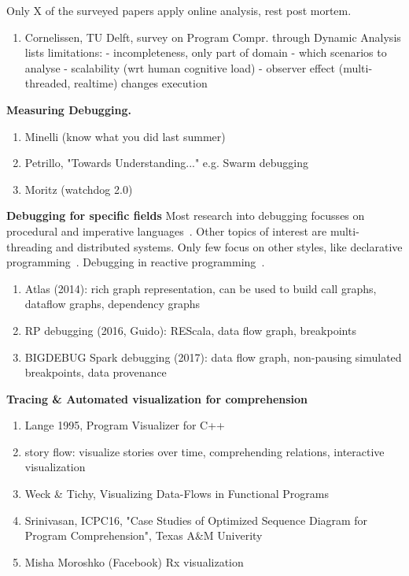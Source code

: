 Only X of the surveyed papers apply online analysis, rest post mortem.

{\color{red}
\begin{enumerate}
 \item Cornelissen, TU Delft, survey on Program Compr. through Dynamic Analysis
 		lists limitations: 
		   - incompleteness, only part of domain
			 - which scenarios to analyse
			 - scalability (wrt human cognitive load) 
		 	 - observer effect (multi-threaded, realtime) changes execution
\end{enumerate}
}

\textbf{Measuring Debugging.}
{\color{red}
\begin{enumerate}
	\item Minelli (know what you did last summer)
	\item Petrillo, "Towards Understanding..." e.g. Swarm debugging
  \item Moritz (watchdog 2.0)
\end{enumerate}
}

\textbf{Debugging for specific fields}
Most research into debugging focusses on procedural and 
imperative languages~\cite{cornelissen2009systematic}.
Other topics of interest are multi-threading and distributed systems.
Only few focus on other styles, like 
declarative programming~\cite{nilsson1998declarative}.
Debugging in reactive programming~\cite{
	salvaneschi2014empirical,salvaneschi2016debugging}.
	
{\color{red}
\begin{enumerate}
	\item Atlas (2014): rich graph representation, can be used to build call graphs, dataflow graphs, dependency graphs
	\item RP debugging (2016, Guido): REScala, data flow graph, breakpoints
	\item BIGDEBUG Spark debugging (2017): data flow graph, non-pausing simulated breakpoints, data provenance
\end{enumerate}
}

\textbf{Tracing \& Automated visualization for comprehension}
\begin{enumerate}\color{red}
 \item Lange 1995, Program Visualizer for C++
 \item story flow: visualize stories over time, comprehending relations, interactive visualization
 \item Weck \& Tichy, Visualizing Data-Flows in Functional Programs
 \item Srinivasan, ICPC16, "Case Studies of Optimized Sequence Diagram for Program Comprehension", Texas A\&M Univerity
 \item Misha Moroshko (Facebook) Rx visualization
\end{enumerate}

